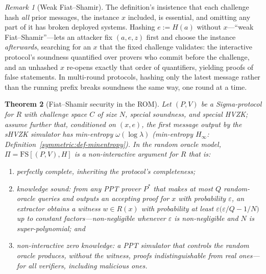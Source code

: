 \documentclass[11pt,a4paper]{article}
\newtheorem{theorem}{Theorem}[section]
\theoremstyle{definition}
\theoremstyle{remark}
\newtheorem{remark}[theorem]{Remark}
\begin{document}
\begin{remark}[Weak Fiat--Shamir]\label{zk:rem:weakfs}
The definition's insistence that each challenge hash \emph{all}
prior messages, the instance \(x\) included, is essential, and
omitting any part of it has broken deployed systems. Hashing
\(e := H(a)\) without \(x\)---``weak Fiat--Shamir''---lets an
attacker fix \((a, e, z)\) first and choose the instance
\emph{afterwards}, searching for an \(x\) that the fixed challenge
validates: the interactive protocol's soundness quantified
over provers who commit before the challenge, and an unhashed \(x\)
re-opens exactly that order of quantifiers, yielding proofs of false
statements. In multi-round protocols, hashing only the latest
message rather than the running prefix breaks soundness the same
way, one round at a time.
\end{remark}

\begin{theorem}[Fiat--Shamir security in the ROM]\label{zk:thm:fs}
Let \((P, V)\) be a Sigma-protocol for \(R\) with challenge space
\(C\) of size \(N\), special soundness, and special HVZK; assume
further that, conditioned on \((x, e)\), the first message output
by the sHVZK simulator has min-entropy \(\omega(\log \lambda)\)
(min-entropy \(H_{\infty}\):
Definition~\ref{symmetric:def-minentropy}).
In the random oracle model,
\(\Pi = \mathrm{FS}[(P, V), H]\) is a non-interactive argument for
\(R\) that is:
\begin{enumerate}
\item \emph{perfectly complete}, inheriting the protocol's
  completeness;
\item \emph{knowledge sound}: from any PPT prover \(P^{*}\) that
  makes at most \(Q\) random-oracle queries and outputs an accepting
  proof for \(x\) with probability \(\varepsilon\), an extractor
  obtains a witness \(w \in R(x)\) with probability at least
  \(\varepsilon \bigl(\varepsilon/Q - 1/N\bigr)\) up to constant
  factors---non-negligible whenever \(\varepsilon\) is
  non-negligible and \(N\) is super-polynomial; and
\item \emph{non-interactive zero knowledge}: a PPT simulator that
  controls the random oracle produces, without the witness, proofs
  indistinguishable from real ones---for all verifiers, including
  malicious ones.
\end{enumerate}
\end{theorem}
\end{document}
